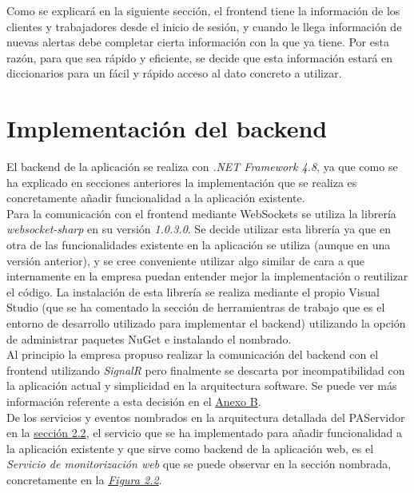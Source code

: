 Como se explicará en la siguiente sección, el frontend tiene la información de los clientes y trabajadores desde el inicio de sesión, y cuando le llega información de nuevas alertas debe completar cierta información con la que ya tiene. Por esta razón, para que sea rápido y eficiente, se decide que esta información estará en diccionarios para un fácil y rápido acceso al dato concreto a utilizar. 


\section{Implementación del backend}

El backend de la aplicación se realiza con \textit{.NET Framework 4.8}, ya que como se ha explicado en secciones anteriores la implementación que se realiza es concretamente añadir funcionalidad a la aplicación existente. \\

Para la comunicación con el frontend mediante WebSockets se utiliza la librería \textit{websocket-sharp} \cite{websocket-sharp} en su versión \textit{1.0.3.0}.
Se decide utilizar esta librería ya que en otra de las funcionalidades existente en la aplicación se utiliza (aunque en una versión anterior), y se cree conveniente utilizar algo similar de cara a que internamente en la empresa puedan entender mejor la implementación o reutilizar el código.
La instalación de esta librería se realiza mediante el propio Visual Studio (que se ha comentado la sección de herramientras de trabajo que es el entorno de desarrollo utilizado para implementar el backend) utilizando la opción de administrar paquetes NuGet e instalando el nombrado. \\

Al principio la empresa propuso realizar la comunicación del backend con el frontend utilizando \textit{SignalR} \cite{signalr} pero finalmente se descarta por incompatibilidad con la aplicación actual y simplicidad en la arquitectura software. Se puede ver más información referente a esta decisión en el \hyperref[anexo-b]{Anexo B}. \\


De los servicios y eventos nombrados en la arquitectura detallada del PAServidor en la \hyperref[section-arquitectura]{sección 2.2}, el servicio que se ha implementado para añadir funcionalidad a la aplicación existente y que sirve como backend de la aplicación web, es el \textit{Servicio de monitorización web} que se puede observar en la sección nombrada, concretamente en la \hyperref[fig:PAServidor]{\textit{Figura 2.2}}.\\


